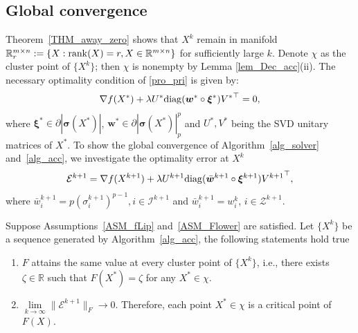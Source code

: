 \documentclass[twoside,11pt]{article}
\numberwithin{equation}{section}
\begin{document}
\subsection{Global convergence}
Theorem~\ref{THM_away_zero} shows that  $ X^{k}  $ remain in manifold $\mathbb{R}_{r}^{m\times{n}} := \{X : {\rm rank}(X)=r, X\in\mathbb{R}^{m\times{n}}\}$ for sufficiently large $k$.
Denote $\chi $ as the cluster point of $\{X^{k}\}$; then 
$\chi $ is nonempty by Lemma \ref{lem_Dec_acc}(ii).  
The necessary optimality condition of \eqref{pro_pri} 
 \cite[Proposition 1]{opt_simu_svd_2017} is given by:
\begin{equation}\label{KKT_condition}
  \nabla{f}(X^{*}) + \lambda U^{*}{\rm diag}(\bm{w}^{*}\circ \bm{\xi}^{*}){V^{*}}^{\top} = 0,  
\end{equation}
where  $\bm{\xi}^{*}\in\partial |\bm{\sigma}(X^*)|   $, $\bm{w}^{*}\in\partial |\bm{\sigma}(X^*)|_{p}^{p}   $ and $U^{*},V^{*}$ being the SVD unitary matrices of $X^{*}$.
To show the global convergence of Algorithm~\ref{alg_solver} and~\ref{alg_acc},  we 
investigate the optimality error at $X^k$
    \begin{equation}\label{KKT_residuals_define}
        \mathcal{E}^{k+1} = \nabla{f}(X^{k+1}) + \lambda U^{k+1}{\rm diag}(\bar{\bm{w}}^{k+1}\circ\bm{\xi}^{k+1}) {V^{k+1}}^{\top},
    \end{equation}
    where $\bar{w}_{i}^{k+1} = p ( {\sigma}^{k+1}_i )^{p-1} ,i\in\mathcal{I}^{k+1}$   
    and $\bar{w}_{i}^{k+1}= w_i^k$, $i\in\mathcal{Z}^{k+1}$.  
 


\begin{theorem}\label{cvgc_Global_ACC_sub}
  Suppose Assumptions~\ref{ASM_fLip} and~\ref{ASM_Flower} are satisfied. Let $\{X^{k}\} $ be a sequence generated by Algorithm~\ref{alg_acc}, the following statements hold true
  \begin{enumerate}[label={(\roman*).},leftmargin=*]
    \item $F$ attains the same value at every cluster point of $\{X^{k}\}$, {i.e.}, there exists $\zeta\in\mathbb{R}$ such that $F(X^{*})=\zeta$ for any $X^{*}\in\chi$.
    \item $\lim\limits_{k\to\infty}\|\mathcal{E}^{k+1} \|_F\to 0$. Therefore, each point $X^{*}\in\chi$ is a critical point of $F(X)$. 
  \end{enumerate} 
\end{theorem}
\end{document}
